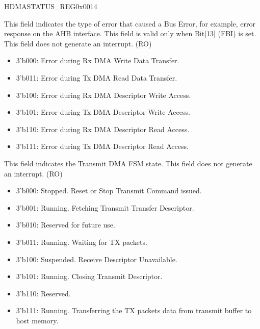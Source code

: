 \addtocounter{Regfloat}{-1}
\begin{register}{H}{DMASTATUS\_REG}{0x0014}\label{regdesc:DMASTATUSREG}
\begin{regdesc}\begin{reglist}
\item [Continued from the previous page...]
\item [ERROR\_BITS]This field indicates the type of error that caused a Bus Error, for example, error response on the AHB interface. This field is valid only when Bit[13] (FBI) is set. This field does not generate an interrupt. (RO)
\begin{itemize}
\item 3'b000: Error during Rx DMA Write Data Transfer. \item 3'b011: Error during Tx DMA Read Data Transfer. \item 3'b100: Error during Rx DMA Descriptor Write Access. \item 3'b101: Error during Tx DMA Descriptor Write Access. \item 3'b110: Error during Rx DMA Descriptor Read Access. \item 3'b111: Error during Tx DMA Descriptor Read Access. \end{itemize}

\item [TRANS\_PROC\_STATE]This field indicates the Transmit DMA FSM state. This field does not generate an interrupt. (RO)\begin{itemize}
\item 3'b000: Stopped. Reset or Stop Transmit Command issued. \item 3'b001: Running. Fetching Transmit Transfer Descriptor. \item 3'b010: Reserved for future use. \item 3'b011: Running. Waiting for TX packets. \item 3'b100: Suspended. Receive Descriptor Unavailable. \item 3'b101: Running. Closing Transmit Descriptor. \item 3'b110: Reserved. \item 3'b111: Running. Transferring the TX packets data from transmit buffer to host memory.
\end{itemize}


\end{reglist}
\end{regdesc}
\end{register}
